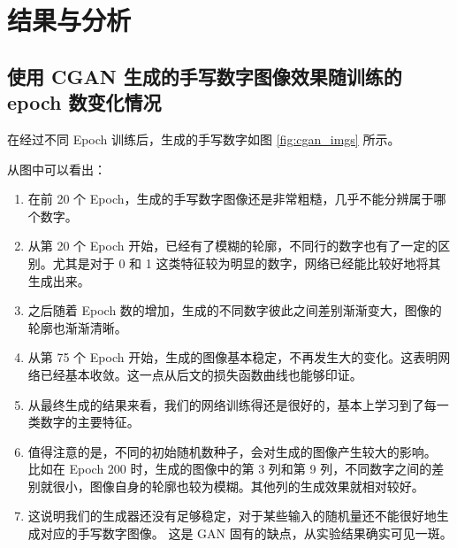 \documentclass[a4paper, 12pt]{article}
\begin{document}
\section{结果与分析}

\subsection{使用 CGAN 生成的手写数字图像效果随训练的 epoch 数变化情况}

在经过不同 Epoch 训练后，生成的手写数字如图 \ref{fig:cgan_imgs} 所示。

从图中可以看出：

\begin{enumerate}[leftmargin=*,labelindent=2em]

\item 在前 20 个 Epoch，生成的手写数字图像还是非常粗糙，几乎不能分辨属于哪个数字。

\item 从第 20 个 Epoch 开始，已经有了模糊的轮廓，不同行的数字也有了一定的区别。尤其是对于 0 和 1 这类特征较为明显的数字，网络已经能比较好地将其生成出来。

\item 之后随着 Epoch 数的增加，生成的不同数字彼此之间差别渐渐变大，图像的轮廓也渐渐清晰。

\item 从第 75 个 Epoch 开始，生成的图像基本稳定，不再发生大的变化。这表明网络已经基本收敛。这一点从后文的损失函数曲线也能够印证。

\item 从最终生成的结果来看，我们的网络训练得还是很好的，基本上学习到了每一类数字的主要特征。

\item 值得注意的是，不同的初始随机数种子，会对生成的图像产生较大的影响。
比如在 Epoch 200 时，生成的图像中的第 3 列和第 9 列，不同数字之间的差别就很小，图像自身的轮廓也较为模糊。其他列的生成效果就相对较好。

\item 这说明我们的生成器还没有足够稳定，对于某些输入的随机量还不能很好地生成对应的手写数字图像。
这是 GAN 固有的缺点，从实验结果确实可见一斑。
\end{enumerate}
\end{document}
